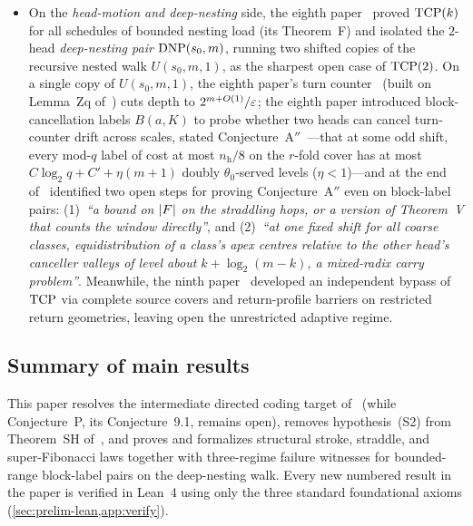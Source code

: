 \begin{itemize}
\item On the \emph{head-motion and deep-nesting} side, the eighth paper~\cite{EighthPaper2026} proved $\mathrm{TCP}(k)$ for all
  schedules of bounded nesting load (its Theorem~F) and isolated the $2$-head \emph{deep-nesting pair} $\mathrm{DNP}(s_0, m)$,
  running two shifted copies of the recursive nested walk $U(s_0, m, 1)$, as the sharpest open case of $\mathrm{TCP}(2)$. On a
  single copy of $U(s_0, m, 1)$, the eighth paper's turn counter~\cite[Section~5.2, Theorem~5.2 and Corollary~5.5]{EighthPaper2026}
  (built on Lemma~Zq of~\cite[Section~5.5, Lemma~5.15]{FourthPaper2026}) cuts depth to $2^{m + O(1)}/\varepsilon$; the eighth
  paper introduced block-cancellation labels $B(a, K)$ to probe whether two heads can cancel turn-counter drift across
  scales, stated Conjecture~A$''$~\cite[Section~5.6, Conjecture~5.24]{EighthPaper2026}---that at some odd shift, every
  mod-$q$ label of cost at most $n_{\mathrm{h}}/8$ on the $r$-fold cover has at most $C\log_2 q + C' + \eta(m+1)$ doubly
  $\theta_0$-served levels ($\eta < 1$)---and at the end of~\cite[Section~5.6]{EighthPaper2026} identified two open steps
  for proving Conjecture~A$''$ even on block-label pairs: (1)~\emph{``a bound on $\lvert F \rvert$ on the straddling hops, or a
  version of Theorem~V that counts the window directly''}, and (2)~\emph{``at one fixed shift for all coarse classes,
  equidistribution of a class's apex centres relative to the other head's canceller valleys of level about
  $k + \log_2(m - k)$, a mixed-radix carry problem''}. Meanwhile, the ninth
  paper~\cite{NinthPaper2026} developed an independent bypass of $\mathrm{TCP}$ via complete source covers and return-profile
  barriers on restricted return geometries, leaving open the unrestricted adaptive regime.
\end{itemize}

\subsection{Summary of main results}

This paper resolves the intermediate directed coding target of~\cite[Section~9.2, item~2]{SeventhPaper2026} (while
Conjecture~P, its Conjecture~9.1, remains open), removes hypothesis~(S2) from Theorem~SH of~\cite{EighthPaper2026}, and
proves and formalizes structural stroke, straddle, and super-Fibonacci laws together with three-regime failure witnesses for
bounded-range block-label pairs on the deep-nesting walk. Every new numbered result in the paper is verified in Lean~4 using
only the three standard foundational axioms (\cref{sec:prelim-lean,app:verify}).

